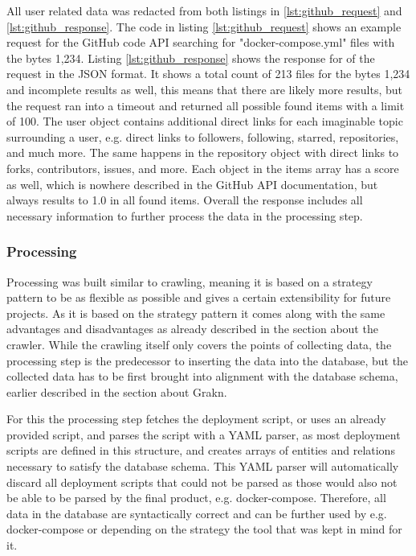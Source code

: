 All user related data was redacted from both listings in \ref{lst:github_request} and \ref{lst:github_response}.
The code in listing \ref{lst:github_request} shows an example request for the GitHub code API searching for "docker-compose.yml" files with the bytes 1,234.
Listing \ref{lst:github_response} shows the response for of the request in the JSON format. It shows a total count of 213 files for the bytes 1,234 and incomplete results as well, this means that there are likely more results, but the request ran into a timeout and returned all possible found items with a limit of 100. The user object contains additional direct links for each imaginable topic surrounding a user, e.g. direct links to followers, following, starred, repositories, and much more. The same happens in the repository object with direct links to forks, contributors, issues, and more. Each object in the items array has a score as well, which is nowhere described in the GitHub API documentation, but always results to 1.0 in all found items.
Overall the response includes all necessary information to further process the data in the processing step.

\subsubsection{Processing}
\label{sec:processing}
Processing was built similar to crawling, meaning it is based on a strategy pattern to be as flexible as possible and gives a certain extensibility for future projects. As it is based on the strategy pattern it comes along with the same advantages and disadvantages as already described in the section about the crawler.
While the crawling itself only covers the points of collecting data, the processing step is the predecessor to inserting the data into the database, but the collected data has to be first brought into alignment with the database schema, earlier described in the section about Grakn.

For this the processing step fetches the deployment script, or uses an already provided script, and parses the script with a YAML parser, as most deployment scripts are defined in this structure, and creates arrays of entities and relations necessary to satisfy the database schema. This YAML parser will automatically discard all deployment scripts that could not be parsed as those would also not be able to be parsed by the final product, e.g. docker-compose. Therefore, all data in the database are syntactically correct and can be further used by e.g. docker-compose or depending on the strategy the tool that was kept in mind for it.

